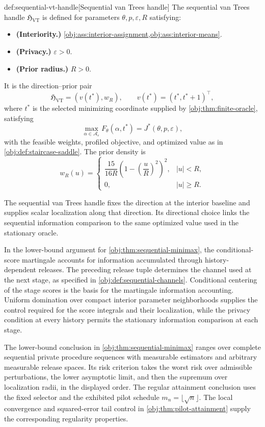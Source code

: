 \documentclass[11pt]{article}
\begin{document}
\begin{definitionv}{def:sequential-vt-handle}[Sequential van Trees handle]
The sequential van Trees handle \(\mathfrak H_{\mathrm{VT}}\) is defined for parameters \(\theta,p,\varepsilon,R\) satisfying:
\begin{itemize}
\item \textbf{(Interiority.)} \cref{obj:ass:interior-assignment,obj:ass:interior-means}.
\item \textbf{(Privacy.)} \(\varepsilon>0\).
\item \textbf{(Prior radius.)} \(R>0\).
\end{itemize}
It is the direction--prior pair
\[
\mathfrak H_{\mathrm{VT}}=(v(t^*),w_R),
\qquad
v(t^*)=(t^*,t^*+1)^{\top},
\]
where \(t^*\) is the selected minimizing coordinate supplied by \cref{obj:thm:finite-oracle}, satisfying
\[
\max_{\alpha\in\mathcal A_\varepsilon}F_\theta(\alpha,t^*)
=J^*(\theta,p,\varepsilon),
\]
with the feasible weights, profiled objective, and optimized value as in \cref{obj:def:staircase-saddle}. The prior density is
\[
w_R(u)=
\begin{cases}
\dfrac{15}{16R}\left(1-\left(\dfrac{u}{R}\right)^2\right)^2,
& |u|<R,\\
0,& |u|\ge R.
\end{cases}
\]
\end{definitionv}

The sequential van Trees handle  fixes the direction at the interior baseline and supplies scalar localization along that direction. Its directional choice links the sequential information comparison to the same optimized value used in the stationary oracle.

In the lower-bound argument for \cref{obj:thm:sequential-minimax}, the conditional-score martingale accounts for information accumulated through history-dependent releases. The preceding release tuple  determines the channel used at the next stage, as specified in \cref{obj:def:sequential-channels}. Conditional centering of the stage scores is the basis for the martingale information accounting. Uniform domination over compact interior parameter neighborhoods supplies the control required for the score integrals and their localization, while the privacy condition at every history permits the stationary information comparison at each stage.

The lower-bound conclusion in \cref{obj:thm:sequential-minimax} ranges over complete sequential private procedure sequences with measurable estimators and arbitrary measurable release spaces. Its risk criterion takes the worst risk over admissible perturbations, the lower asymptotic limit, and then the supremum over localization radii, in the displayed order. The regular attainment conclusion uses the fixed selector and the exhibited pilot schedule \(m_n=\lfloor\sqrt n\rfloor\). The local convergence and squared-error tail control in \cref{obj:thm:pilot-attainment} supply the corresponding regularity properties.
\end{document}
